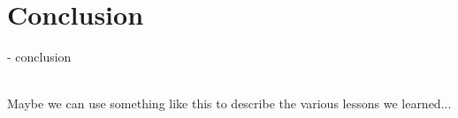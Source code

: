 \documentclass{report}
\begin{document}
\chapter{Conclusion}
- conclusion








\begin{framed}
 \\
Maybe we can use something like this to describe the various lessons we
learned...
\end{framed}
\end{document}
